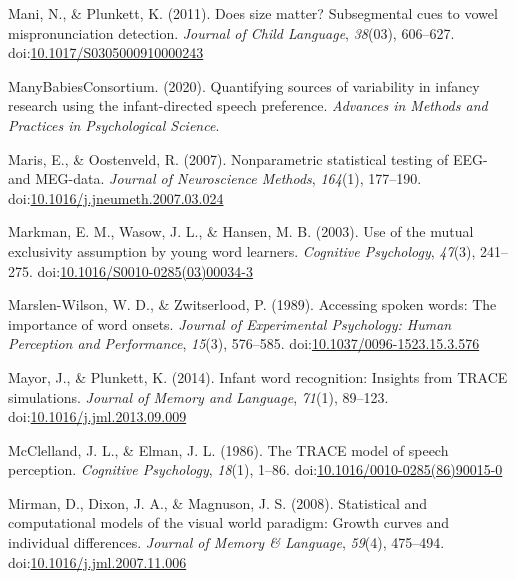 \documentclass[man, noextraspace]{apa6}
\begin{document}
\leavevmode\hypertarget{ref-Mani2011}{}%
Mani, N., \& Plunkett, K. (2011). Does size matter? Subsegmental cues to vowel mispronunciation detection. \emph{Journal of Child Language}, \emph{38}(03), 606--627. doi:\href{https://doi.org/10.1017/S0305000910000243}{10.1017/S0305000910000243}

\leavevmode\hypertarget{ref-MB1}{}%
ManyBabiesConsortium. (2020). Quantifying sources of variability in infancy research using the infant-directed speech preference. \emph{Advances in Methods and Practices in Psychological Science}.

\leavevmode\hypertarget{ref-Maris2007}{}%
Maris, E., \& Oostenveld, R. (2007). Nonparametric statistical testing of EEG- and MEG-data. \emph{Journal of Neuroscience Methods}, \emph{164}(1), 177--190. doi:\href{https://doi.org/10.1016/j.jneumeth.2007.03.024}{10.1016/j.jneumeth.2007.03.024}

\leavevmode\hypertarget{ref-Markman2003}{}%
Markman, E. M., Wasow, J. L., \& Hansen, M. B. (2003). Use of the mutual exclusivity assumption by young word learners. \emph{Cognitive Psychology}, \emph{47}(3), 241--275. doi:\href{https://doi.org/10.1016/S0010-0285(03)00034-3}{10.1016/S0010-0285(03)00034-3}

\leavevmode\hypertarget{ref-Marslen-Wilson1989}{}%
Marslen-Wilson, W. D., \& Zwitserlood, P. (1989). Accessing spoken words: The importance of word onsets. \emph{Journal of Experimental Psychology: Human Perception and Performance}, \emph{15}(3), 576--585. doi:\href{https://doi.org/10.1037/0096-1523.15.3.576}{10.1037/0096-1523.15.3.576}

\leavevmode\hypertarget{ref-Mayor2014}{}%
Mayor, J., \& Plunkett, K. (2014). Infant word recognition: Insights from TRACE simulations. \emph{Journal of Memory and Language}, \emph{71}(1), 89--123. doi:\href{https://doi.org/10.1016/j.jml.2013.09.009}{10.1016/j.jml.2013.09.009}

\leavevmode\hypertarget{ref-McClelland1986}{}%
McClelland, J. L., \& Elman, J. L. (1986). The TRACE model of speech perception. \emph{Cognitive Psychology}, \emph{18}(1), 1--86. doi:\href{https://doi.org/10.1016/0010-0285(86)90015-0}{10.1016/0010-0285(86)90015-0}

\leavevmode\hypertarget{ref-Mirman2008}{}%
Mirman, D., Dixon, J. A., \& Magnuson, J. S. (2008). Statistical and computational models of the visual world paradigm: Growth curves and individual differences. \emph{Journal of Memory \& Language}, \emph{59}(4), 475--494. doi:\href{https://doi.org/10.1016/j.jml.2007.11.006}{10.1016/j.jml.2007.11.006}
\end{document}
